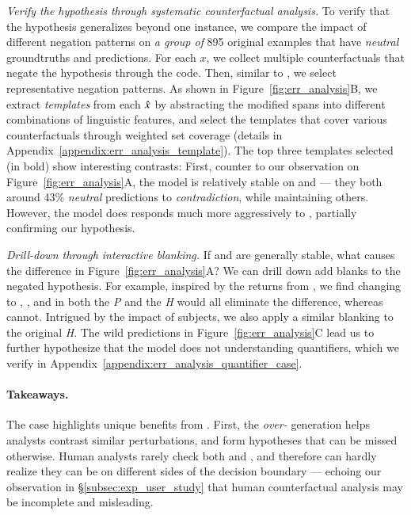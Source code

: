 \emph{Verify the hypothesis through systematic counterfactual analysis.}
To verify that the hypothesis generalizes beyond one instance, we compare the impact of different negation patterns on \emph{a group of} 895 original examples that have \emph{neutral} groundtruths and predictions.
For each $x$, we collect multiple counterfactuals that negate the hypothesis through the  code.
Then, similar to \citet{wu2020tempura}, we select representative negation patterns.
As shown in Figure~\ref{fig:err_analysis}B, we extract \emph{templates} from each $\hat{x}$ by abstracting the modified spans into different combinations of linguistic features, and select the templates that cover various counterfactuals through weighted set coverage (details in Appendix~\ref{appendix:err_analysis_template}).
The top three templates selected (in bold) show interesting contrasts:
First, counter to our observation on Figure~\ref{fig:err_analysis}A, the model is relatively stable on  and  --- they both around 43\% \emph{neutral} predictions to \emph{contradiction}, while maintaining others.
However, the model does responds much more aggressively to , partially confirming our hypothesis.

\emph{Drill-down through interactive blanking.}
If  and  are generally stable, what causes the difference in Figure~\ref{fig:err_analysis}A?
We can drill down add blanks to the negated hypothesis.
For example, inspired by the returns from , we find changing  to , , and  in both the \emph{P} and the \emph{H} would all eliminate the difference, whereas  cannot.
Intrigued by the impact of subjects, we also apply a similar blanking to the original \emph{H}.
The wild predictions in Figure~\ref{fig:err_analysis}C lead us to further hypothesize that the model does not understanding quantifiers, which we verify in Appendix~\ref{appendix:err_analysis_quantifier_case}.


\paragraph{Takeaways.}
The case highlights unique benefits from \sysname.
First, the \emph{over-} generation helps analysts contrast similar perturbations, and form hypotheses that can be missed otherwise.
Human analysts rarely check both  and , and therefore can hardly realize they can be on different sides of the decision boundary --- echoing our observation in \S\ref{subsec:exp_user_study} that human counterfactual analysis may be incomplete and misleading.

